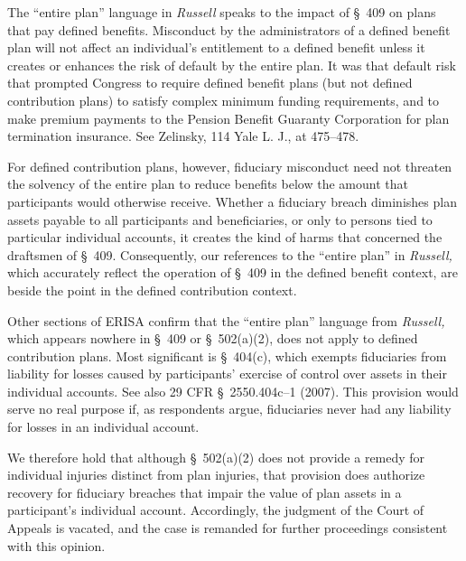 {\begin{quote}
      \end{quote}

  The ``entire plan'' language in \emph{Russell} speaks to the impact of \S~409 on plans that pay defined benefits. Misconduct by the administrators of a defined benefit plan will not affect an individual's entitlement to a defined benefit unless it creates or enhances the risk of default by the entire plan. It was that default risk that prompted Congress to require defined benefit plans (but not defined contribution plans) to satisfy complex minimum funding requirements, and to make premium payments to the Pension Benefit Guaranty Corporation for plan termination insurance. See Zelinsky, 114 Yale L. J., at 475--478.

  For defined contribution plans, however, fiduciary misconduct need not threaten the solvency of the entire plan to \newpage  reduce benefits below the amount that participants would otherwise receive. Whether a fiduciary breach diminishes plan assets payable to all participants and beneficiaries, or only to persons tied to particular individual accounts, it creates the kind of harms that concerned the draftsmen of \S~409. Consequently, our references to the ``entire plan'' in \emph{Russell,} which accurately reflect the operation of \S~409 in the defined benefit context, are beside the point in the defined contribution context.


  Other sections of ERISA confirm that the ``entire plan'' language from \emph{Russell,} which appears nowhere in \S~409 or \S~502(a)(2), does not apply to defined contribution plans. Most significant is \S~404(c), which exempts fiduciaries from liability for losses caused by participants' exercise of control over assets in their individual accounts. See also 29 CFR \S~2550.404c--1 (2007). This provision would serve no real purpose if, as respondents argue, fiduciaries never had any liability for losses in an individual account.

  We therefore hold that although \S~502(a)(2) does not provide a remedy for individual injuries distinct from plan injuries, that provision does authorize recovery for fiduciary breaches that impair the value of plan assets in a participant's individual account. Accordingly, the judgment of the Court of Appeals is vacated, and the case is remanded for further proceedings consistent with this opinion.\footnotemark[6]

}
